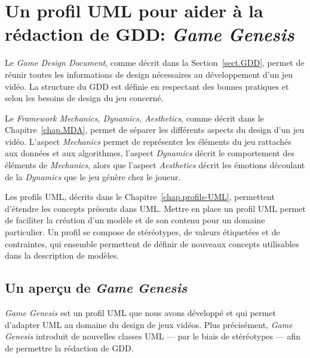 \chapter{Un profil UML pour aider à la rédaction de GDD: \emph{Game Genesis}}
\label{game-genesis.sect}

Le \emph{Game Design Document}, comme décrit dans la Section~\ref{sect.GDD}, permet de réunir toutes les informations de design nécessaires au développement d'un jeu vidéo. La structure du GDD est définie en respectant des bonnes pratiques et selon les besoins de design du jeu concerné.



Le \emph{Framework Mechanics, Dynamics, Aesthetics}, comme décrit dans le Chapitre~\ref{chap.MDA}, permet de séparer les différents aspects du design d'un jeu vidéo. L'aspect \emph{Mechanics} permet de représenter les éléments du jeu rattachés aux données et aux algorithmes, l'aspect \emph{Dynamics} décrit le comportement des \'el\'ements de \emph{Mechanics}, alors que l'aspect \emph{Aesthetics} d\'ecrit les émotions découlant de la \emph{Dynamics} que le jeu génère chez le joueur.

Les profils UML, décrits dans le Chapitre~\ref{chap.profils-UML}, permettent d'étendre les concepts présents dans UML. Mettre en place un profil UML permet de faciliter la cr\'eation d'un modèle et de son contenu pour un domaine particulier. Un profil se compose de stéréotypes, de valeurs étiquetées et de contraintes, qui ensemble permettent de d\'efinir de nouveaux concepts utilisables dans la description de modèles.


\section{Un aper\c{c}u de \emph{Game Genesis}}
\label{sect.gg_what}
\emph{Game Genesis} est un profil UML que nous avons d\'evelopp\'e et qui permet d'adapter UML au domaine du design de jeux vidéos. 
Plus précisément, \emph{Game Genesis} introduit de nouvelles classes UML --- par le biais de st\'er\'eotypes --- afin de permettre la rédaction de GDD.



